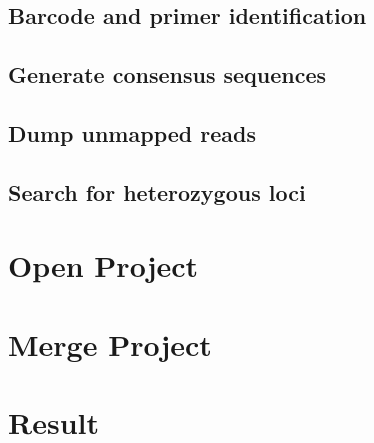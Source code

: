\documentclass[11pt]{article}
\begin{document}
\subsection[Barcode and primer identification]{Barcode and primer identification}
\label{sec-4-1}
\subsection[Generate consensus sequences]{Generate consensus sequences}
\label{sec-4-2}
\subsection[Dump unmapped reads]{Dump unmapped reads}
\label{sec-4-3}
\subsection[Search for heterozygous loci]{Search for heterozygous loci}
\label{sec-4-4}

\section[Open Project]{Open Project}
\label{sec-5}
\section[Merge Project]{Merge Project}
\label{sec-6}
\section[Result]{Result}
\label{sec-7}
\end{document}
